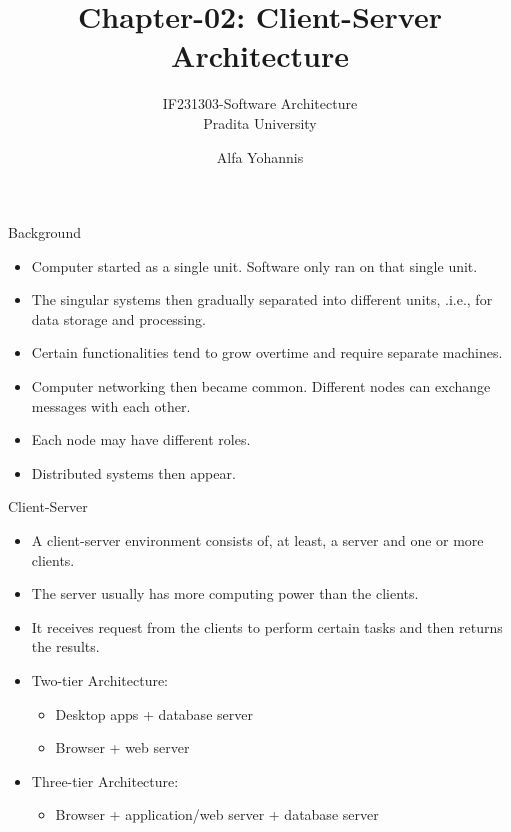 \documentclass{beamer}
\title{Chapter-02: Client-Server Architecture}
\subtitle{IF231303-Software Architecture\\Pradita University}
\author{Alfa Yohannis}
\begin{document}
\begin{frame}[plain]
    \maketitle
\end{frame}

\begin{frame}{Background}
\begin{itemize}
\item Computer started as a single unit.  Software only ran on that single unit.
\item The singular systems then gradually separated into different units, .i.e., for data storage and processing.
\item Certain functionalities tend to grow overtime and require separate machines.
\item Computer networking then became common. Different nodes can exchange messages with each other.
\item Each node may have different roles.
\item Distributed systems then appear.
\end{itemize}
\end{frame}

\begin{frame}{Client-Server}
\begin{itemize}
\item A client-server environment consists of, at least, a server and one or more clients.
\item The server usually has more computing power than the clients. 
\item It receives request from the clients to perform certain tasks and then returns the results.
\item Two-tier Architecture:
\begin{itemize}
\item Desktop apps + database server
\item Browser + web server
\end{itemize}
\item Three-tier Architecture:
\begin{itemize}
\item Browser + application/web server + database server
\end{itemize}
\end{itemize}
\end{frame}
\end{document}
